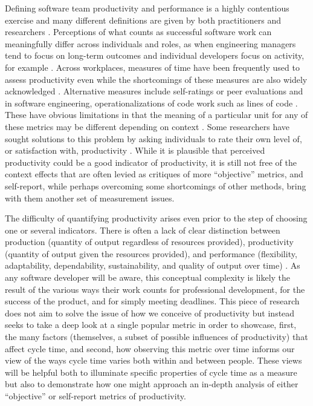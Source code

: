 \documentclass[
  sn-mathphys-ay,
]{sn-jnl}
\begin{document}
Defining software team productivity and performance is a highly
contentious exercise and many different definitions are given by both
practitioners and researchers
\citep{fraserNoSilverBullet2007, hicksDeveloperThrivingFour2023, hicksDeveloperThrivingFour2024, murphy-hillWhatPredictsSoftware2021, sadowskiSoftwareDevelopmentProductivity2019}.
Perceptions of what counts as successful software work can meaningfully
differ across individuals and roles, as when engineering managers tend
to focus on long-term outcomes and individual developers focus on
activity, for example
\citep{hicksDeveloperThrivingFour2023, storeyHowDevelopersManagers2022b}.
Across workplaces, measures of time have been frequently used to assess
productivity even while the shortcomings of these measures are also
widely acknowledged \citep{griffinMetricsMeasuringProduct1993}.
Alternative measures include self-ratings or peer evaluations
\citep{murphy-hillWhatPredictsSoftware2021, ramirezMeasuringKnowledgeWorker2004}
and in software engineering, operationalizations of code work such as
lines of code
\citep{blackburnImprovingSpeedProductivity1996, maxwellSoftwareDevelopmentProductivity1996}.
These have obvious limitations in that the meaning of a particular unit
for any of these metrics may be different depending on context
\citep{sadowskiSoftwareDevelopmentProductivity2019}. Some researchers
have sought solutions to this problem by asking individuals to rate
their own level of, or satisfaction with, productivity
\citep{hicksDeveloperThrivingFour2023, storeyTheorySoftwareDeveloper2021}.
While it is plausible that perceived productivity could be a good
indicator of productivity, it is still not free of the context effects
that are often levied as critiques of more ``objective'' metrics, and
self-report, while perhaps overcoming some shortcomings of other
methods, bring with them another set of measurement issues.

The difficulty of quantifying productivity arises even prior to the step
of choosing one or several indicators. There is often a lack of clear
distinction between production (quantity of output regardless of
resources provided), productivity (quantity of output given the
resources provided), and performance (flexibility, adaptability,
dependability, sustainability, and quality of output over time)
\citep{hicksDeveloperThrivingFour2023}. As any software developer will
be aware, this conceptual complexity is likely the result of the various
ways their work counts for professional development, for the success of
the product, and for simply meeting deadlines. This piece of research
does not aim to solve the issue of how we conceive of productivity but
instead seeks to take a deep look at a single popular metric in order to
showcase, first, the many factors (themselves, a subset of possible
influences of productivity) that affect cycle time, and second, how
observing this metric over time informs our view of the ways cycle time
varies both within and between people. These views will be helpful both
to illuminate specific properties of cycle time as a measure but also to
demonstrate how one might approach an in-depth analysis of either
``objective'' or self-report metrics of productivity.
\end{document}
